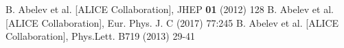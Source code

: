 \begin{thebibliography}{99}
 B. Abelev et al. [ALICE Collaboration], JHEP {\bf 01} (2012) 128
 B. Abelev et al. [ALICE Collaboration], Eur. Phys. J. C (2017) 77:245
 B. Abelev et al. [ALICE Collaboration], Phys.Lett. B719 (2013) 29-41
\end{thebibliography} 